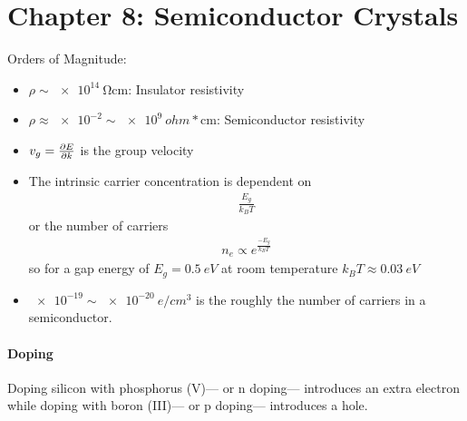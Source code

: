 \documentclass[../main.tex]{subfiles}
\begin{document}
\pagestyle{fancy}

\section*{Chapter 8: Semiconductor Crystals}

Orders of Magnitude:
\begin{itemize}
    \item $\rho \sim \qty{e14}{\ohm\cm}$: Insulator resistivity
    \item $\rho \approx \num{e-2} \sim \qty{e9}{ohm*\cm}$: Semiconductor resistivity
    \item $v_g = \pdv{E}{k}$ is the group velocity
    \item The intrinsic carrier concentration is dependent on
    \begin{align*}
        \frac{E_g}{k_B T}
    \end{align*}
    or the number of carriers
    \begin{align*}
        n_e \propto e^{\frac{-E_g}{k_B T}}
    \end{align*}
    so for a gap energy of $E_g = \qty{0.5}{eV}$ at room temperature $k_B T \approx \qty{0.03}{eV}$
    \item $\num{e-19} \sim \qty{e-20}{e/cm^3}$ is the roughly the number of carriers in a semiconductor.
\end{itemize}
\paragraph*{Doping} Doping silicon with phosphorus (V)--- or n doping--- introduces an extra electron
while doping with boron (III)--- or p doping--- introduces a hole.
\end{document}
